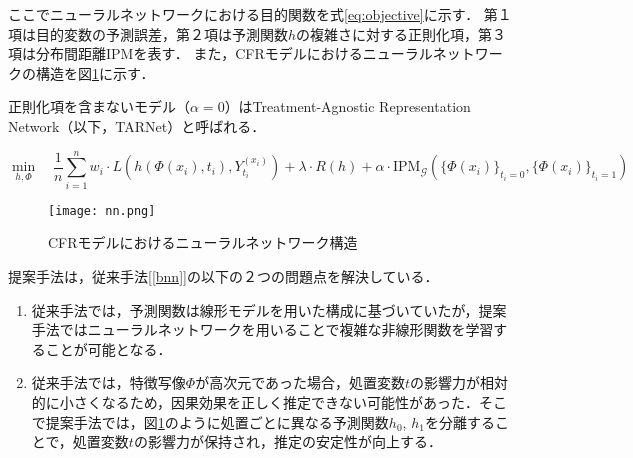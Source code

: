 \documentclass[dvipdfmx]{jreport}
\begin{document}
ここでニューラルネットワークにおける目的関数を式\eqref{eq:objective}に示す．
第１項は目的変数の予測誤差，第２項は予測関数$h$の複雑さに対する正則化項，第３項は分布間距離IPMを表す．
また，CFRモデルにおけるニューラルネットワークの構造を図\ref{fig:nn}に示す．

正則化項を含まないモデル（$\alpha = 0$）はTreatment-Agnostic Representation Network（以下，TARNet）と呼ばれる．

\begin{equation}
    \min_{h, \Phi} \quad
    \frac{1}{n} \sum_{i=1}^{n} w_i \cdot L \left( h(\Phi(x_i), t_i), Y_{t_i}^{(x_i)} \right) 
    + \lambda \cdot R(h)
    + \alpha \cdot \mathrm{IPM}_{\mathcal{G}} 
    \left( 
    \{ \Phi(x_i) \}_{t_i = 0}, \{ \Phi(x_i) \}_{t_i = 1}
    \right) \label{eq:objective}
\end{equation}

\begin{figure}[h]
    \begin{center}
        \texttt{[image: nn.png]}
    \end{center}
    \caption{CFRモデルにおけるニューラルネットワーク構造} \label{fig:nn}
\end{figure}

提案手法は，従来手法[\ref{bnn}]の以下の２つの問題点を解決している．
\begin{tcolorbox}[title=\textbf{提案手法で解決した問題点}]
    \begin{enumerate}
        \item 従来手法では，予測関数は線形モデルを用いた構成に基づいていたが，提案手法ではニューラルネットワークを用いることで複雑な非線形関数を学習することが可能となる．
        \item 従来手法では，特徴写像$\Phi$が高次元であった場合，処置変数$t$の影響力が相対的に小さくなるため，因果効果を正しく推定できない可能性があった．そこで提案手法では，図\ref{fig:nn}のように処置ごとに異なる予測関数$h_0$, $h_1$を分離することで，処置変数$t$の影響力が保持され，推定の安定性が向上する．
    \end{enumerate}
\end{tcolorbox}
\end{document}
